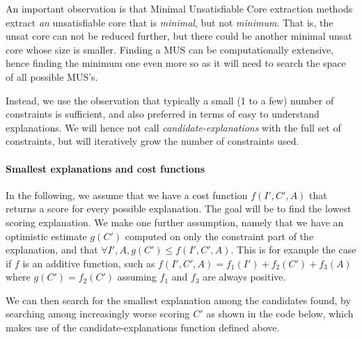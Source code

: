 \begin{algorithmic}
   
     
  \EndFor
\EndFunction
\end{algorithmic}

An important observation is that Minimal Unsatisfiable Core extraction methods extract \textit{an} unsatisfiable core that is \textit{minimal}, but not \textit{minimum}. That is, the unsat core can not be reduced further, but there could be another minimal unsat core whose size is smaller. Finding a MUS can be computationally extensive, hence finding the minimum one even more so as it will need to search the space of all possible MUS's.



Instead, we use the observation that typically a small (1 to a few) number of constraints is sufficient, and also preferred in terms of easy to understand explanations. We will hence not call \textit{candidate-explanations} with the full set of constraints, but will iteratively grow the number of constraints used.

\paragraph{Smallest explanations and cost functions}
In the following, we assume that we have a cost function $f(I', C', A)$ that returns a score for every possible explanation. The goal will be to find the lowest scoring explanation. We make one further assumption, namely that we have an optimistic estimate $g(C')$ computed on only the constraint part of the explanation, and that $\forall I', A, g(C') \leq f(I', C', A)$. This is for example the case if $f$ is an additive function, such as $f(I', C', A) = f_1(I') + f_2(C') + f_3(A)$ where $g(C') = f_2(C')$ assuming $f_1$ and $f_3$ are always positive.

We can then search for the smallest explanation among the candidates found, by searching among increasingly worse scoring $C'$ as shown in the code below, which makes use of the candidate-explanations function defined above.


